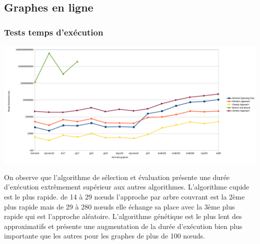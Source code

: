 \documentclass[10pt,a4paper]{report}
\begin{document}
	\subsection{Graphes en ligne}
		\subsubsection{Tests temps d'exécution}
			\includegraphics[scale=0.45]{./Ressource/temps_graphes_site.png}
			
			On observe que l'algorithme de sélection et évaluation présente une durée d'exécution extrêmement supérieur aux autres algorithmes.
			L'algorithme cupide est le plus rapide. de 14 à 29 nœuds l'approche par arbre couvrant est la 2ème plus rapide mais de 29 à 280 nœuds elle échange sa place avec la 3ème plus rapide qui est l'approche aléatoire.
			L'algorithme génétique est le plus lent des approximatifs et présente une augmentation de la durée d'exécution bien plus importante que les autres pour les graphes de plus de 100 nœuds.
		
	
\end{document}
